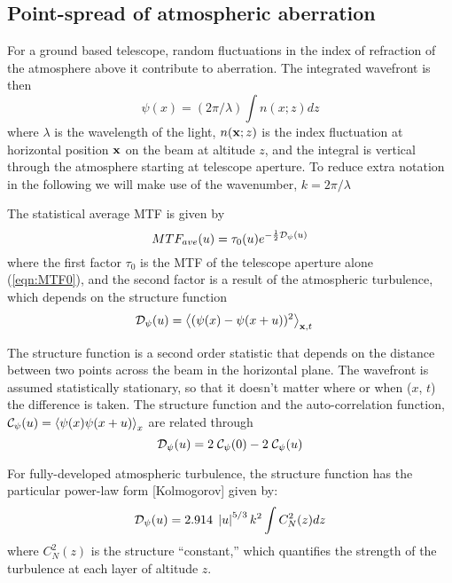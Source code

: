 \documentclass[11pt, oneside]{article}   	%
\begin{document}
\subsection{Point-spread of atmospheric aberration}

For a ground based telescope, random fluctuations in the index of refraction of the atmosphere above it contribute to aberration. The integrated wavefront is then
\begin{equation}
\label{eqn:on_axis_wf}
\psi(x) = (2 \pi / \lambda) \int{ n(x;z) dz }
\end{equation}
where $\lambda$ is the wavelength of the light, $n({\bf x};z)$ is the index fluctuation at horizontal position ${\bf x}$ on the beam at altitude $z$, and the integral is vertical through the atmosphere starting at telescope aperture. To reduce extra notation in the following we will make use of the wavenumber, $k = 2 \pi / \lambda$

The statistical average MTF is given by\cite{Fried1966}
\begin{equation}
MTF_{ave}(u) = \tau_0(u) e^{-\frac{1}{2}{\cal D}_{\psi}(u)}
\end{equation}
where the first factor $\tau_0$ is the MTF of the telescope aperture alone (\ref{eqn:MTF0}), and the second factor is a result of the atmospheric turbulence, which depends on the structure function
\begin{align}
{\cal D}_{\psi}(u) &= \left< ( \psi(x) - \psi(x+u))^2 \right>_{{\bf x}, t}
\end{align}

The structure function is a second order statistic that depends on the distance between two points across the beam in the horizontal plane. The wavefront is assumed statistically stationary, so that it doesn't matter where or when ($x$, $t$) the difference is taken. The structure function and the auto-correlation function, ${\cal C}_{\psi}(u) = \left< \psi(x)\psi(x+u) \right>_x$ are related through
\begin{equation}
\label{eqn:DCrelation}
{\cal D}_{\psi}(u)  = 2\; {\cal C}_{\psi}(0) - 2\; {\cal C}_{\psi}(u) 
\end{equation}

For fully-developed atmospheric turbulence, the structure function has the particular power-law form [Kolmogorov] given by:
\begin{equation}
\label{eqn:SFpower}
{\cal D}_{\psi}(u) = 2.914\; \left | u \right | ^{5/3}  k^2 \int C_N^2(z) dz 
\end{equation}
where $C_N^2(z)$
is the structure ``constant,'' which quantifies the strength of the turbulence at each layer of altitude $z$.
\end{document}
